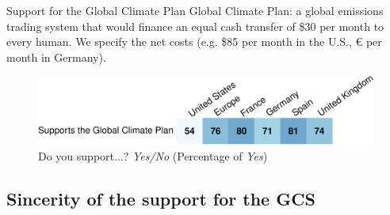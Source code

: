 \documentclass[aspectratio=169,xcolor=dvipsnames, 11pt,mathserif]{beamer}
\begin{document}
\begin{frame}{Support for the Global Climate Plan\label{gcs_support} \hyperlink{support}{}}
\bbvs 
\ip Global Climate Plan: a global emissions trading system that would finance an equal cash transfer of \$30 per month to every human.
\ip We specify the net costs (e.g. \$85 per month in the U.S., \euro{} per month in Germany).
\ee \vspace{-.3cm}
    \begin{figure}
        \centering %
        \caption{Do you support...? \textit{Yes/No} (Percentage of \textit{Yes}) \hyperlink{gcs_perceptions}{} \hyperlink{conjoint_ab}{} \hyperlink{gcs_vote}{} \hyperlink{national_policies}{}}
        \includegraphics[width=\textwidth]{../figures/country_comparison/gcs_support_positive.pdf} %
    \end{figure}
\end{frame}

\subsection{Sincerity of the support for the GCS}
\end{document}
